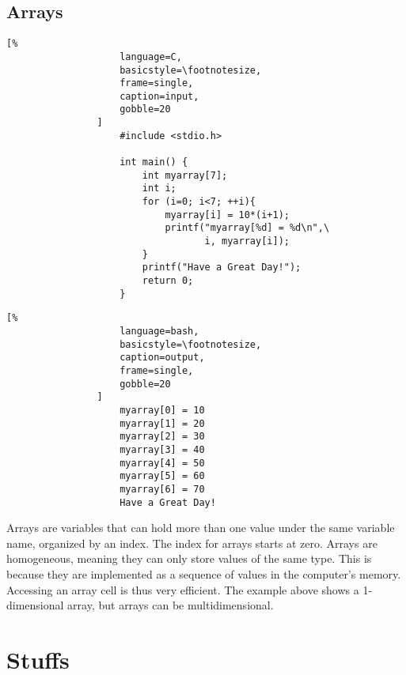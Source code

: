 \documentclass[crop=false,class=book]{standalone}
\begin{document}
        \subsection{Arrays}
            \begin{minipage}[t]{.48\textwidth}
                \centering
                \begin{lstlisting}[%
                    language=C,
                    basicstyle=\footnotesize,
                    frame=single,
                    caption=input,
                    gobble=20
                ]
                    #include <stdio.h>
                    
                    int main() {
                        int myarray[7];
                        int i;
                        for (i=0; i<7; ++i){
                            myarray[i] = 10*(i+1);
                            printf("myarray[%d] = %d\n",\
                                   i, myarray[i]);
                        }
                        printf("Have a Great Day!");
                        return 0;
                    }
                \end{lstlisting}
            \end{minipage}\hfill
            \begin{minipage}[t]{.48\textwidth}
                \centering
                \begin{lstlisting}[%
                    language=bash,
                    basicstyle=\footnotesize,
                    caption=output,
                    frame=single,
                    gobble=20
                ]
                    myarray[0] = 10
                    myarray[1] = 20
                    myarray[2] = 30
                    myarray[3] = 40
                    myarray[4] = 50
                    myarray[5] = 60
                    myarray[6] = 70
                    Have a Great Day!
            \end{lstlisting}
        \end{minipage}
            \newpage
            Arrays are variables that can hold more than one value
            under the same variable name, organized by an index. The
            index for arrays starts at zero. Arrays are
            homogeneous, meaning they can only store values of the
            same type. This is because they are implemented as a
            sequence of values in the computer's memory. Accessing
            an array cell is thus very efficient. The example above
            shows a 1-dimensional array, but arrays can be
            multidimensional.
\section{Stuffs}
\end{document}
